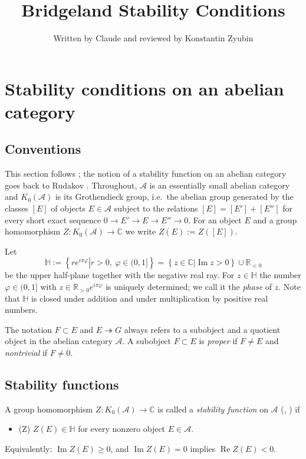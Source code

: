 \documentclass[12pt]{amsart}
\title{Bridgeland Stability Conditions}
\author{Written by Claude and reviewed by Konstantin Zyubin}
\makeatletter
\newcommand{\condlabel}[2]{\phantomsection\def\@currentlabel{#1}\label{#2}\textup{(#1)}}
\numberwithin{theorem}{section}
\theoremstyle{definition}
\newcommand{\CC}{\mathbb{C}}
\newcommand{\RR}{\mathbb{R}}
\newcommand{\HH}{\mathbb{H}}
\newcommand{\calA}{\mathcal{A}}
\newcommand{\Kgroup}{K_0}
\newcommand{\re}{\operatorname{Re}}
\newcommand{\im}{\operatorname{Im}}
\newcommand{\defineset}[2]{\left\{
	\left.
	#1
	\right\vert
	#2
	\right\}}
\makeatother
\begin{document}
	
	\maketitle
	\tableofcontents
	
	\section{Stability conditions on an abelian category}
	
	\subsection{Conventions}
	
	This section follows \cite[\S 4]{MS17}; the notion of a stability function on an abelian category goes back to Rudakov \cite{Rud97}.
	Throughout, $\calA$ is an essentially small abelian category and $\Kgroup(\calA)$ is its Grothendieck group, i.e.\ the abelian group generated by the classes $[E]$ of objects $E \in \calA$ subject to the relations $[E] = [E'] + [E'']$ for every short exact sequence $0 \to E' \to E \to E'' \to 0$. For an object $E$ and a group homomorphism $Z \colon \Kgroup(\calA) \to \CC$ we write $Z(E) := Z([E])$.
	
	Let
	\[
	\HH := \defineset{ r e^{i \pi \varphi} }{ r > 0,\ \varphi \in (0, 1] }
	= \defineset{ z \in \CC }{ \im z > 0 } \cup \RR_{<0}
	\]
	be the upper half-plane together with the negative real ray. For $z \in \HH$ the number $\varphi \in (0, 1]$ with $z \in \RR_{>0} e^{i \pi \varphi}$ is uniquely determined; we call it the \emph{phase} of $z$. Note that $\HH$ is closed under addition and under multiplication by positive real numbers.
	
	The notation $F \subset E$ and $E \twoheadrightarrow G$ always refers to a subobject and a quotient object in the abelian category $\calA$. A subobject $F \subset E$ is \emph{proper} if $F \neq E$ and \emph{nontrivial} if $F \neq 0$.
	
	\subsection{Stability functions}
	
	A group homomorphism $Z \colon \Kgroup(\calA) \to \CC$ is called a \emph{stability function} on $\calA$ (\cite[Def.~4.1]{MS17}, \cite[Def.~2.1]{Bri07}) if
	\begin{itemize}
		\item[] \condlabel{Z}{cond:Z} $Z(E) \in \HH$ for every nonzero object $E \in \calA$.
	\end{itemize}
	Equivalently: $\im Z(E) \geqslant 0$, and $\im Z(E) = 0$ implies $\re Z(E) < 0$.
	
\end{document}
